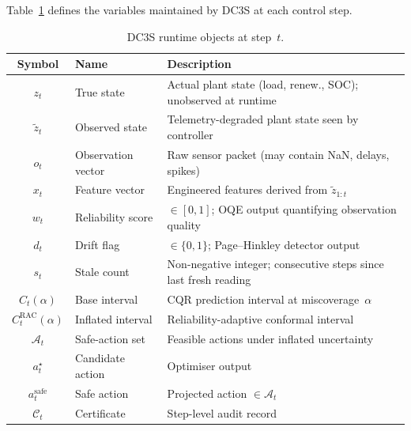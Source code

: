 Table~\ref{tab:runtime-objects} defines the variables maintained by DC3S at
each control step.

\begin{table}[ht]
\centering
\caption{DC3S runtime objects at step~$t$.}
\label{tab:runtime-objects}
\begin{tabular}{cll}
\toprule
\textbf{Symbol} & \textbf{Name} & \textbf{Description} \\
\midrule
$z_t$            & True state          & Actual plant state (load, renew., SOC);
                                         unobserved at runtime \\
$\tilde{z}_t$    & Observed state      & Telemetry-degraded plant state seen by
                                         controller \\
$o_t$            & Observation vector  & Raw sensor packet (may contain NaN,
                                         delays, spikes) \\
$x_t$            & Feature vector      & Engineered features derived from
                                         $\tilde{z}_{1:t}$ \\
$w_t$            & Reliability score   & $\in [0,1]$; OQE output quantifying
                                         observation quality \\
$d_t$            & Drift flag          & $\in \{0,1\}$; Page--Hinkley detector
                                         output \\
$s_t$            & Stale count         & Non-negative integer; consecutive steps
                                         since last fresh reading \\
$C_t(\alpha)$    & Base interval       & CQR prediction interval at
                                         miscoverage~$\alpha$ \\
$C_t^{\mathrm{RAC}}(\alpha)$ & Inflated interval &
                   Reliability-adaptive conformal interval \\
$\mathcal{A}_t$  & Safe-action set     & Feasible actions under inflated
                                         uncertainty \\
$a_t^\star$      & Candidate action    & Optimiser output \\
$a_t^{\mathrm{safe}}$ & Safe action    & Projected action $\in \mathcal{A}_t$ \\
$\mathcal{C}_t$  & Certificate         & Step-level audit record \\
\bottomrule
\end{tabular}
\end{table}

